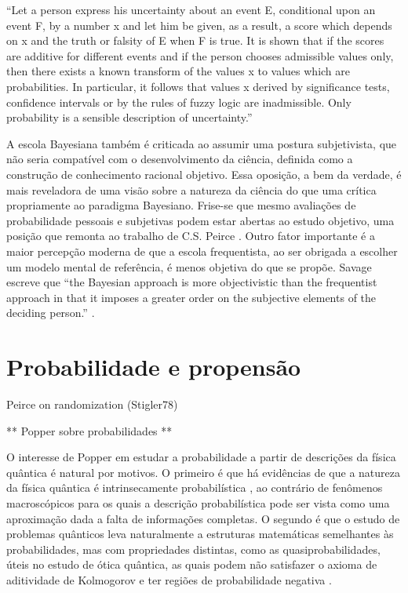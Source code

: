 ``Let a person express his uncertainty about an event E, conditional upon an event F, by a number x and let him be given, 
as a result, a score which depends on x and the truth or falsity of E when F is true. It is shown that if the scores are 
additive for different events and if the person chooses admissible values only, then there exists a known transform of the 
values x to values which are probabilities. In particular, it follows that values x derived by significance tests, confidence 
intervals or by the rules of fuzzy logic are inadmissible. Only probability is a sensible description of uncertainty.''
\citep{Lindley82}

A escola Bayesiana também é criticada ao assumir uma postura subjetivista, que não seria compatível com o desenvolvimento
da ciência, definida como a construção de conhecimento racional objetivo. Essa oposição, a bem da verdade, é mais reveladora
de uma visão sobre a natureza da ciência do que uma crítica propriamente ao paradigma Bayesiano. Frise-se que mesmo 
avaliações de probabilidade pessoais e subjetivas podem estar abertas ao estudo objetivo, uma posição que remonta ao trabalho
de C.S. Peirce \citep{Stigler78}.
Outro fator importante é a maior percepção moderna
de que a escola frequentista, ao ser obrigada a escolher um modelo mental de referência, é menos objetiva do que se propõe.
Savage escreve que ``the Bayesian approach is more objectivistic than the frequentist approach in that it imposes a greater
order on the subjective elements of the deciding person.'' \citep{Savage60}.

\section{Probabilidade e propensão}

Peirce on randomization (Stigler78)

	** Popper sobre probabilidades **

O interesse de Popper em estudar a probabilidade a partir de descrições da física quântica é natural por motivos. O primeiro
é que há evidências de que a natureza da física quântica é intrinsecamente probabilística \citep{Gudder88}, ao contrário 
de fenômenos
macroscópicos para os quais a descrição probabilística pode ser vista como uma aproximação dada a falta de informações completas.
O segundo é que o estudo de problemas quânticos leva naturalmente a estruturas matemáticas semelhantes às probabilidades, mas
com	propriedades distintas, como as quasiprobabilidades, úteis no estudo de ótica quântica, as quais podem não satisfazer o
axioma de aditividade de Kolmogorov e ter regiões de probabilidade negativa \citep{Mandel95}.

